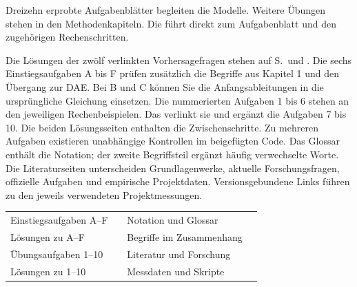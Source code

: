 \clearpage\renewcommand{\running}{Aufgaben und Quellen}
\vspace{3pt}
Dreizehn erprobte Aufgabenblätter begleiten die Modelle. Weitere Übungen stehen in den Methodenkapiteln. Die  führt direkt zum Aufgabenblatt und den zugehörigen Rechenschritten.\par
{}
Die Lösungen der zwölf verlinkten Vorhersagefragen stehen auf S.\, und . Die sechs Einstiegsaufgaben A bis F prüfen zusätzlich die Begriffe aus Kapitel 1 und den Übergang zur DAE. Bei B und C können Sie die Anfangsableitungen in die ursprüngliche Gleichung einsetzen.
Die nummerierten Aufgaben 1 bis 6 stehen an den jeweiligen Rechenbeispielen. Das  verlinkt sie und ergänzt die Aufgaben 7 bis 10. Die beiden Lösungsseiten enthalten die Zwischenschritte. Zu mehreren Aufgaben existieren unabhängige Kontrollen im beigefügten Code.
Das Glossar enthält die Notation; der zweite Begriffsteil ergänzt häufig verwechselte Worte. Die Literaturseiten unterscheiden Grundlagenwerke, aktuelle Forschungsfragen, offizielle Aufgaben und empirische Projektdaten. Versionsgebundene Links führen zu den jeweils verwendeten Projektmessungen.
{\tblstart\begin{tabularx}{\linewidth}{@{}Y r Y r@{}}\toprule
{}&&&\\\midrule
Einstiegsaufgaben A--F&&Notation und Glossar&\\
Lösungen zu A--F&&Begriffe im Zusammenhang&\\
Übungsaufgaben 1--10&&Literatur und Forschung&\\
Lösungen zu 1--10&&Messdaten und Skripte&\\\bottomrule
\end{tabularx}\par}

